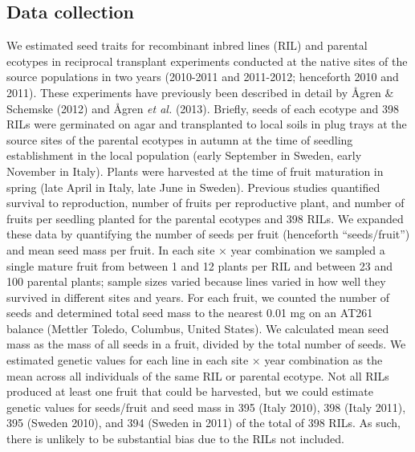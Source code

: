 \documentclass[
]{article}
\begin{document}
\hypertarget{data-collection}{%
\subsection{Data collection}\label{data-collection}}

We estimated seed traits for recombinant inbred lines (RIL) and parental ecotypes in reciprocal transplant experiments conducted at the native sites of the source populations in two years (2010-2011 and 2011-2012; henceforth 2010 and 2011). These experiments have previously been described in detail by Ågren \& Schemske (2012) and Ågren \emph{et al.} (2013). Briefly, seeds of each ecotype and 398 RILs were germinated on agar and transplanted to local soils in plug trays at the source sites of the parental ecotypes in autumn at the time of seedling establishment in the local population (early September in Sweden, early November in Italy). Plants were harvested at the time of fruit maturation in spring (late April in Italy, late June in Sweden). Previous studies quantified survival to reproduction, number of fruits per reproductive plant, and number of fruits per seedling planted for the parental ecotypes and 398 RILs. We expanded these data by quantifying the number of seeds per fruit (henceforth ``seeds/fruit'') and mean seed mass per fruit. In each site × year combination we sampled a single mature fruit from between 1 and 12 plants per RIL and between 23 and 100 parental plants; sample sizes varied because lines varied in how well they survived in different sites and years. For each fruit, we counted the number of seeds and determined total seed mass to the nearest 0.01 mg on an AT261 balance (Mettler Toledo, Columbus, United States). We calculated mean seed mass as the mass of all seeds in a fruit, divided by the total number of seeds. We estimated genetic values for each line in each site × year combination as the mean across all individuals of the same RIL or parental ecotype. Not all RILs produced at least one fruit that could be harvested, but we could estimate genetic values for seeds/fruit and seed mass in 395 (Italy 2010), 398 (Italy 2011), 395 (Sweden 2010), and 394 (Sweden in 2011) of the total of 398 RILs. As such, there is unlikely to be substantial bias due to the RILs not included.
\end{document}
